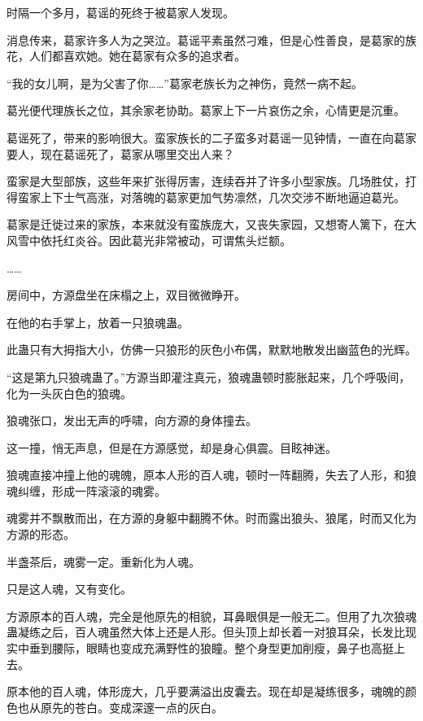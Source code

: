 
\begin{this_body}

时隔一个多月，葛谣的死终于被葛家人发现。

消息传来，葛家许多人为之哭泣。葛谣平素虽然刁难，但是心性善良，是葛家的族花，人们都喜欢她。她在葛家有众多的追求者。

“我的女儿啊，是为父害了你……”葛家老族长为之神伤，竟然一病不起。

葛光便代理族长之位，其余家老协助。葛家上下一片哀伤之余，心情更是沉重。

葛谣死了，带来的影响很大。蛮家族长的二子蛮多对葛谣一见钟情，一直在向葛家要人，现在葛谣死了，葛家从哪里交出人来？

蛮家是大型部族，这些年来扩张得厉害，连续吞并了许多小型家族。几场胜仗，打得蛮家上下士气高涨，对落魄的葛家更加气势凛然，几次交涉不断地逼迫葛光。

葛家是迁徙过来的家族，本来就没有蛮族庞大，又丧失家园，又想寄人篱下，在大风雪中依托红炎谷。因此葛光非常被动，可谓焦头烂额。

……

房间中，方源盘坐在床榻之上，双目微微睁开。

在他的右手掌上，放着一只狼魂蛊。

此蛊只有大拇指大小，仿佛一只狼形的灰色小布偶，默默地散发出幽蓝色的光辉。

“这是第九只狼魂蛊了。”方源当即灌注真元，狼魂蛊顿时膨胀起来，几个呼吸间，化为一头灰白色的狼魂。

狼魂张口，发出无声的呼啸，向方源的身体撞去。

这一撞，悄无声息，但是在方源感觉，却是身心俱震。目眩神迷。

狼魂直接冲撞上他的魂魄，原本人形的百人魂，顿时一阵翻腾，失去了人形，和狼魂纠缠，形成一阵滚滚的魂雾。

魂雾并不飘散而出，在方源的身躯中翻腾不休。时而露出狼头、狼尾，时而又化为方源的形态。

半盏茶后，魂雾一定。重新化为人魂。

只是这人魂，又有变化。

方源原本的百人魂，完全是他原先的相貌，耳鼻眼俱是一般无二。但用了九次狼魂蛊凝练之后，百人魂虽然大体上还是人形。但头顶上却长着一对狼耳朵，长发比现实中垂到腰际，眼睛也变成充满野性的狼瞳。整个身型更加削瘦，鼻子也高挺上去。

原本他的百人魂，体形庞大，几乎要满溢出皮囊去。现在却是凝练很多，魂魄的颜色也从原先的苍白。变成深邃一点的灰白。


\end{this_body}
